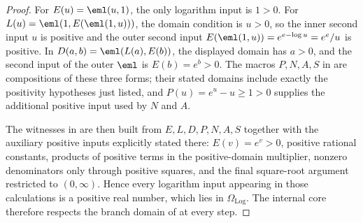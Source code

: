 \begin{proof}
For \(E(u)=\eml(u,1)\), the only logarithm input is \(1>0\).  For
\(L(u)=\eml(1,E(\eml(1,u)))\), the domain condition is \(u>0\), so the inner
second input \(u\) is positive and the outer second input
\(E(\eml(1,u))=e^{e-\log u}=e^e/u\) is positive.  In
\(D(a,b)=\eml(L(a),E(b))\), the displayed domain has \(a>0\), and the second
input of the outer \(\eml\) is \(E(b)=e^b>0\).  The macros
\(P,N,A,S\) in  are compositions of these three
forms; their stated domains include exactly the positivity hypotheses just
listed, and \(P(u)=e^u-u\ge1>0\) supplies the additional positive input used by
\(N\) and \(A\).

The witnesses in  are then built from
\(E,L,D,P,N,A,S\) together with the auxiliary positive inputs explicitly stated
there: \(E(v)=e^v>0\), positive rational constants, products of positive terms in
the positive-domain multiplier, nonzero denominators only through positive
squares, and the final square-root argument restricted to \((0,\infty)\).  Hence
every logarithm input appearing in those calculations is a positive real number,
which lies in \(\Omega_{\mathrm{Log}}\).  The internal core therefore respects the branch
domain of  at every step.
\end{proof}

